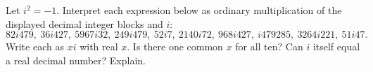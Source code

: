 Let $i^2=-1$. Interpret each expression below as ordinary multiplication of the displayed decimal integer blocks and $i$:
\[
82i479,\ 36i427,\ 5967i32,\ 249i479,\ 52i7,\ 
2140i72,\ 968i427,\ i479285,\ 3264i221,\ 51i47.
\]
Write each as $xi$ with real $x$. Is there one common $x$ for all ten? Can $i$ itself equal a real decimal number? Explain.

